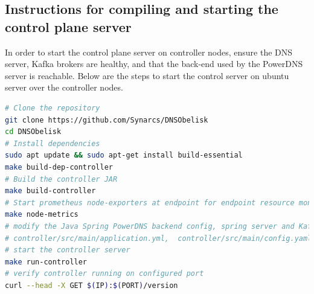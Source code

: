 \documentclass [11pt, proquest] {uwthesis}[2020/02/24]
\begin{document}
\subsection{Instructions for compiling and starting the control plane server}
In order to start the control plane server on controller nodes, ensure the DNS server, Kafka brokers are healthy, and that the back-end used by the PowerDNS server is reachable. Below are the steps to start the control server on ubuntu server over the controller nodes.

{\footnotesize
\begin{lstlisting}[language=bash, 
    caption={Installation steps for compiling and running controller server in control plane}, 
    label={lst:install-steps-control-plane},
    aboveskip=0.5em, 
    belowskip=0.5em
]
# Clone the repository
git clone https://github.com/Synarcs/DNSObelisk
cd DNSObelisk
# Install dependencies
sudo apt update && sudo apt-get install build-essential 
make build-dep-controller 
# Build the controller JAR
make build-controller 
# Start prometheus node-exporters at endpoint for endpoint resource monitoring 
make node-metrics
# modify the Java Spring PowerDNS backend config, spring server and Kafka broker connection config to point to correct endpoints
# controller/src/main/application.yml,  controller/src/main/config.yaml
# start the controller server
make run-controller
# verify controller running on configured port
curl --head -X GET $(IP):$(PORT)/version 
\end{lstlisting}
}



\end{document}
